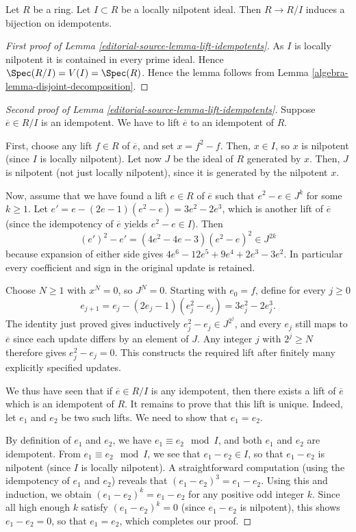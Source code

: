 \begin{lemma}
\label{editorial-source-lemma-lift-idempotents}
Let $R$ be a ring. Let $I \subset R$ be a locally nilpotent ideal.
Then $R \to R/I$ induces a bijection on idempotents.
\end{lemma}

\begin{proof}[First proof of Lemma \ref{editorial-source-lemma-lift-idempotents}]
As $I$ is locally nilpotent it is contained in every prime ideal.
Hence $\Spec(R/I) = V(I) = \Spec(R)$. Hence the
lemma follows from Lemma \ref{algebra-lemma-disjoint-decomposition}.
\end{proof}

\begin{proof}[Second proof of Lemma \ref{editorial-source-lemma-lift-idempotents}]
Suppose $\overline{e} \in R/I$ is an idempotent.
We have to lift $\overline{e}$ to an idempotent of $R$.

\medskip\noindent
First, choose any lift $f \in R$ of $\overline{e}$, and set
$x = f^2 - f$. Then, $x \in I$, so $x$ is nilpotent (since $I$
is locally nilpotent). Let now $J$ be the ideal of $R$ generated
by $x$. Then, $J$ is nilpotent (not just locally nilpotent),
since it is generated by the nilpotent $x$.

\medskip\noindent
Now, assume that we have found a lift $e \in R$ of $\overline{e}$
such that $e^2 - e \in J^k$ for some $k \geq 1$.
Let $e' = e - (2e - 1)(e^2 - e) = 3e^2 - 2e^3$, which is another
lift of $\overline{e}$ (since the idempotency of $\overline{e}$
yields $e^2 - e \in I$). Then
$$
(e')^2 - e' = (4e^2 - 4e - 3)(e^2 - e)^2 \in J^{2k}
$$
because expansion of either side gives
$4e^6-12e^5+9e^4+2e^3-3e^2$.
In particular every coefficient and sign in the original update is retained.

\medskip\noindent
Choose $N\geq1$ with $x^N=0$, so $J^N=0$.
Starting with $e_0=f$, define for every $j\geq0$
$$
e_{j+1}=e_j-(2e_j-1)(e_j^2-e_j)=3e_j^2-2e_j^3.
$$
The identity just proved gives inductively
$e_j^2-e_j\in J^{2^j}$, and every $e_j$ still maps to
$\overline e$ since each update differs by an element of $J$.
Any integer $j$ with $2^j\geq N$ therefore gives
$e_j^2-e_j=0$. This constructs the required lift after finitely
many explicitly specified updates.

\medskip\noindent
We thus have seen that if $\overline{e} \in R/I$ is any
idempotent, then there exists a lift of $\overline{e}$
which is an idempotent of $R$.
It remains to prove that this lift is unique. Indeed, let
$e_1$ and $e_2$ be two such lifts. We
need to show that $e_1 = e_2$.

\medskip\noindent
By definition of $e_1$ and $e_2$, we have $e_1 \equiv e_2
\mod I$, and both $e_1$ and $e_2$ are idempotent. From
$e_1 \equiv e_2 \mod I$, we see that $e_1 - e_2 \in I$,
so that $e_1 - e_2$ is nilpotent (since $I$ is locally nilpotent).
A straightforward
computation (using the idempotency of $e_1$ and $e_2$)
reveals that $(e_1 - e_2)^3 = e_1 - e_2$. Using this and
induction, we obtain $(e_1 - e_2)^k = e_1 - e_2$ for any
positive odd integer $k$. Since all high enough $k$ satisfy
$(e_1 - e_2)^k = 0$ (since $e_1 - e_2$ is nilpotent),
this shows $e_1 - e_2 = 0$, so that $e_1 = e_2$, which
completes our proof.
\end{proof}